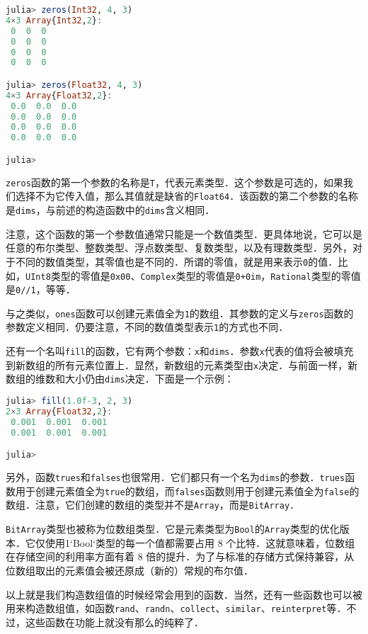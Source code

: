 \begin{lstlisting}[language=julia]
julia> zeros(Int32, 4, 3)
4×3 Array{Int32,2}:
 0  0  0
 0  0  0
 0  0  0
 0  0  0

julia> zeros(Float32, 4, 3)
4×3 Array{Float32,2}:
 0.0  0.0  0.0
 0.0  0.0  0.0
 0.0  0.0  0.0
 0.0  0.0  0.0

julia> 
\end{lstlisting}

\verb|zeros|函数的第一个参数的名称是\verb|T|，代表元素类型．这个参数是可选的，如果我们选择不为它传入值，那么其值就是缺省的\verb|Float64|．该函数的第二个参数的名称是\verb|dims|，与前述的构造函数中的\verb|dims|含义相同．

注意，这个函数的第一个参数值通常只能是一个数值类型．更具体地说，它可以是任意的布尔类型、整数类型、浮点数类型、复数类型，以及有理数类型．另外，对于不同的数值类型，其零值也是不同的．所谓的零值，就是用来表示\verb|0|的值．比如，\verb|UInt8|类型的零值是\verb|0x00|、\verb|Complex|类型的零值是\verb|0+0im|，\verb|Rational|类型的零值是\verb|0//1|，等等．

与之类似，\verb|ones|函数可以创建元素值全为\verb|1|的数组．其参数的定义与\verb|zeros|函数的参数定义相同．仍要注意，不同的数值类型表示\verb|1|的方式也不同．

还有一个名叫\verb|fill|的函数，它有两个参数：\verb|x|和\verb|dims|．参数\verb|x|代表的值将会被填充到新数组的所有元素位置上．显然，新数组的元素类型由\verb|x|决定．与前面一样，新数组的维数和大小仍由\verb|dims|决定．下面是一个示例：

\begin{lstlisting}[language=julia]
julia> fill(1.0f-3, 2, 3)
2×3 Array{Float32,2}:
 0.001  0.001  0.001
 0.001  0.001  0.001

julia> 
\end{lstlisting}

另外，函数\verb|trues|和\verb|falses|也很常用．它们都只有一个名为\verb|dims|的参数．\verb|trues|函数用于创建元素值全为\verb|true|的数组，而\verb|falses|函数则用于创建元素值全为\verb|false|的数组．注意，它们创建的数组的类型并不是\verb|Array|，而是\verb|BitArray|．

\verb|BitArray|类型也被称为位数组类型．它是元素类型为\verb|Bool|的\verb|Array|类型的优化版本．它仅使用1`Bool`类型的每一个值都需要占用 8 个比特．这就意味着，位数组在存储空间的利用率方面有着 8 倍的提升．为了与标准的存储方式保持兼容，从位数组取出的元素值会被还原成（新的）常规的布尔值．

以上就是我们构造数组值的时候经常会用到的函数．当然，还有一些函数也可以被用来构造数组值，如函数\verb|rand|、\verb|randn|、\verb|collect|、\verb|similar|、\verb|reinterpret|等．不过，这些函数在功能上就没有那么的纯粹了．
